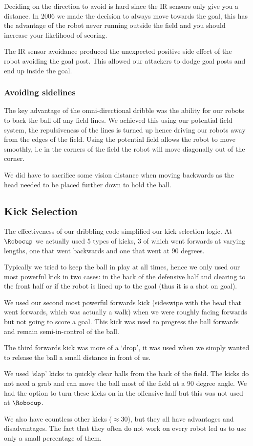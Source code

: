 Deciding on the direction to avoid is hard since the IR sensors only
give you a distance. In 2006 we made the decision to always move
towards the goal, this has the advantage of the robot never running
outside the field and you should increase your likelihood of scoring. 

The IR sensor avoidance produced the unexpected
positive side effect of the robot avoiding the goal post. This allowed our attackers to
dodge goal posts and end up inside the goal.

\subsubsection{Avoiding sidelines}

The key advantage of the omni-directional dribble was the ability for
our robots to back the ball off any field lines. We achieved this using our potential field system, the repulsiveness
of the lines is turned up hence driving our robots away from the
edges of the field. Using the potential field allows the robot to
move smoothly, i.e in the corners of the field the robot will move
diagonally out of the corner.

We did have to sacrifice some vision distance when moving backwards as the head needed to be placed further down to hold the ball.

\subsection{Kick Selection}

The effectiveness of our dribbling code simplified our kick
selection logic. At $\Robocup$ we actually used 5 types of kicks, 3 of
which went forwards at varying lengths, one that went backwards and one that went at 90 degrees.

Typically we tried to keep the ball in play at all times, hence we
only used our most powerful kick in two cases: in the back of the
defensive half and clearing to the front half or if the robot is
lined up to the goal (thus it is a shot on goal). 

We used our second most powerful forwards kick (sideswipe with the head that
went forwards, which was actually a walk) when we were roughly
facing forwards but not going to score a goal. This kick was used to 
progress the ball forwards and remain semi-in-control of the ball.

The third forwards kick was more of a `drop', it was used when we simply
wanted to release the ball a small distance in front of us.

We used `slap' kicks to quickly clear balls from the back of the field. The kicks do not need a grab and can move the ball most of the field at a 90 degree angle. We had the option to turn these kicks on in the offensive half but this was not used at $\Robocup$.

We also have countless other kicks ($\approx$30), but they all have
advantages and disadvantages. The fact that they often do not work
on every robot led us to use only a small percentage of them.

